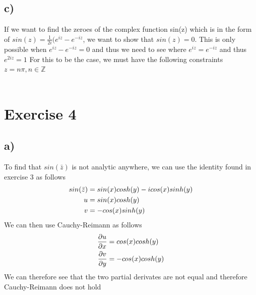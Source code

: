 \documentclass[notitlepage]{article}
\newcommand{\HwBreak}{%
  \par\noindent\makebox[\linewidth]{\rule{0.9\paperwidth}{0.4pt}}\par%
}
\begin{document}
    \subsection*{c)}
    If we want to find the zeroes of the complex function sin(z) which is in the form of $ sin(z)= \frac{1}{2i}(e^{iz}-e^{-iz}$, we want to show that $sin(z) = 0$.
    This is only possible when $e^{iz}-e^{-iz}=0$ and thus we need to see where $e^{iz}=e^{-iz}$ and thus $e^{2iz}=1$ For this to be the case, we must have the following 
    constraints $z=n \pi , n \in \mathbb{Z}$ \\~\\

\HwBreak
\section*{Exercise 4}
    \subsection*{a)}
    To find that $sin(\bar{z})$ is not analytic anywhere, we can use the identity found in exercise 3 as follows
\begin{equation}
    \begin{aligned}
        sin(\bar{z})    &= sin(x)cosh(y)-icos(x)sinh(y) \notag \\
        u               &= sin(x)cosh(y) \\
        v               &= -cos(x)sinh(y)
    \end{aligned}
\end{equation}
    We can then use Cauchy-Reimann as follows
\begin{equation}
    \begin{aligned}
        \frac{\partial u}{\partial x} &= cos(x)cosh(y) \notag \\
        \frac{\partial v}{\partial y} &= -cos(x)cosh(y)
    \end{aligned}
\end{equation}
    We can therefore see that the two partial derivates are not equal and therefore Cauchy-Reimann does not hold
\end{document}
